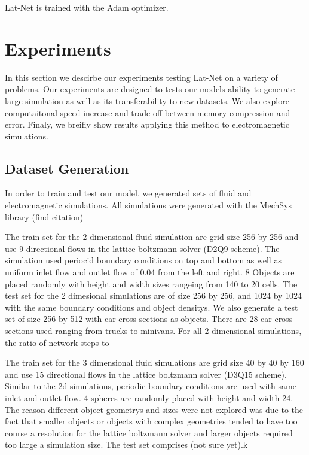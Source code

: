 \documentclass{article}
\begin{document}

Lat-Net is trained with the Adam optimizer\cite{kingma2014adam}.

\section{Experiments}

In this section we descirbe our experiments testing Lat-Net on a variety of problems. Our experiments are designed to tests our models ability to generate large simulation as well as its transferability to new datasets. We also explore computaitonal speed increase and trade off between memory compression and error. Finaly, we breifly show results applying this method to electromagnetic simulations.

\subsection{Dataset Generation}
In order to train and test our model, we generated sets of fluid and electromagnetic simulations. All simulations were generated with the MechSys library (find citation)

The train set for the 2 dimensional fluid simulation are grid size 256 by 256 and use 9 directional flows in the lattice boltzmann solver (D2Q9 scheme)\cite{guo2013lattice}. The simulation used periocid boundary conditions on top and bottom as well as uniform inlet flow and outlet flow of 0.04 from the left and right. 8 Objects are placed randomly with height and width sizes rangeing from 140 to 20 cells. The test set for the 2 dimesional simulations are of size 256 by 256, and 1024 by 1024 with the same boundary conditions and object densitys. We also generate a test set of size 256 by 512 with car cross sections as objects. There are 28 car cross sections used ranging from trucks to minivans. For all 2 dimensional simulations, the ratio of network steps to 

The train set for the 3 dimensional fluid simulations are grid size 40 by 40 by 160 and use 15 directional flows in the lattice boltzmann solver (D3Q15 scheme)\cite{guo2013lattice}. Similar to the 2d simulations, periodic boundary conditions are used with same inlet and outlet flow. 4 spheres are randomly placed with height and width 24. The reason different object geometrys and sizes were not explored was due to the fact that smaller objects or objects with complex geometries tended to have too course a resolution for the lattice boltzmann solver and larger objects required too large a simulation size. The test set comprises (not sure yet).k
\end{document}
